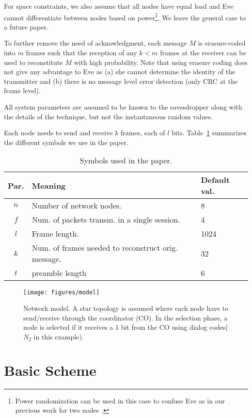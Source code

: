 \documentclass[10pt,letterpaper,conference]{IEEEtran}
\begin{document}
For space constraints, we also assume that all nodes have equal load and Eve
cannot differentiate between nodes based on power\footnote{Power randomization
can be used in this case to confuse Eve as in our previous work
for two nodes \cite{Elmorsy}.}. We leave the general case to a future paper.

To further remove the need of acknowledgment, each message $M$ is erasure-coded
into $m$ frames such that the reception of any $k < m$ frames at the receiver
can be used to reconstitute $M$ with high probability. Note that using erasure
coding does not give any advantage to Eve as (a) she cannot determine the
identity of the transmitter and (b) there is no message level error detection
(only CRC at the frame level).

All system parameters are assumed to be known to the eavesdropper along with the
details of the technique, but not the instantaneous random values.

Each node needs to send and receive $k$ frames, each of $l$ bits. 
Table~\ref{Symbol_table} summarizes the
different symbols we use in the paper.

\begin{table}[!t]
\begin{tabular}{|c|l|l|}
\hline
Par. & Meaning & Default val. \\
\hline
\hline
$n$  & Number of network nodes. & 8\tabularnewline
\hline
$f$  & Num. of packets transm. in a single session. & 4\tabularnewline
\hline
$l$  & Frame length. & 1024\tabularnewline
\hline
$k$  & Num. of frames needed to reconstruct orig.
message. & 32\tabularnewline
\hline
$t$  & preamble length & 6\tabularnewline
\hline
\end{tabular}
\caption{Symbols used in the paper.}
\label{Symbol_table}
\end{table}

\begin{figure}
\centering
\texttt{[image: figures/model]}
\caption{Network model. A star topology is assumed where each node have to
send/receive through the coordinator (CO). In the selection phase, a node is selected if it receives a 1 bit from the CO using dialog codes($N_2$ in this
example).}
\label{fig:Network}
\end{figure}

\section{Basic Scheme}
\label{sec:basic}
\end{document}
